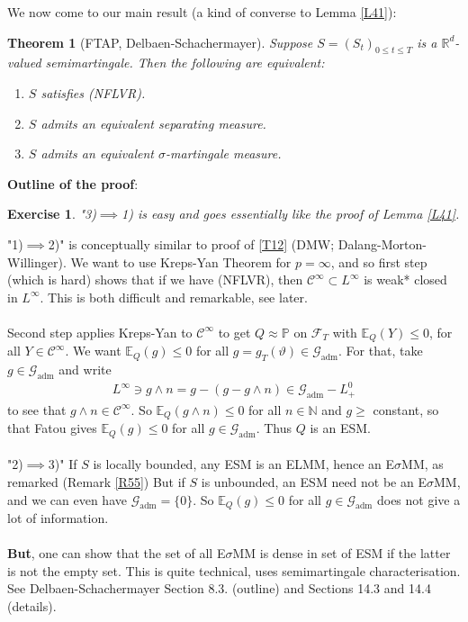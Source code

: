 \documentclass[12pt,a4paper, twoside]{article}
\newtheorem{thm}{Theorem}[section]
\newtheorem{exe}{Exercise}[section]
\theoremstyle{definition}
\newcommand{\EE}{\mathbb{E}} %
\newcommand{\PP}{\mathbb{P}} %
\begin{document}
\newpage
We now come to our main result (a kind of converse to Lemma \ref{L41}):
\begin{thm}[FTAP, Delbaen-Schachermayer] \label{T45} Suppose $S=(S_t)_{0 \leq t \leq T}$ is a $\mathbb{R}^d$-valued semimartingale. Then the following are equivalent:
\begin{enumerate}
\item $S$ satisfies (NFLVR).
\item $S$ admits an equivalent separating measure.
\item $S$ admits an equivalent $\sigma$-martingale measure. 
\end{enumerate}
\end{thm}
\noindent \textbf{Outline of  the proof}:
\begin{exe} \label{ex16} "3)$\implies$1) is easy and goes essentially like the proof of Lemma \ref{L41}.
\end{exe}
\noindent "1)$\implies$2)" is conceptually similar to proof of \ref{T12} (DMW; Dalang-Morton-Willinger). We want to use Kreps-Yan Theorem for $p= \infty$, and so first step (which is hard) shows that if we have (NFLVR), then $\mathcal{C}^\infty \subset L^\infty$ is weak* closed in $L^\infty$. This is both difficult and remarkable,  see later. \\
\\
Second step applies Kreps-Yan to $\mathcal{C}^\infty$ to get $Q \approx \PP$ on $\mathcal{F}_T$ with $\EE_Q(Y) \leq 0$, for all $Y \in \mathcal{C}^\infty$. We want $\EE_Q(g) \leq 0$ for all $g= g_T( \vartheta) \in \mathcal{G}_\text{adm}$. For that, take $g \in \mathcal{G}_\text{adm}$ and write 
\begin{align*}
L^\infty \ni g \wedge n = g-(g-g \wedge n) \in \mathcal{G}_\text{adm}-L_+^0
\end{align*}
to see that $g \wedge n \in \mathcal{C}^\infty$. So $\EE_Q(g \wedge n) \leq 0$ for all $n \in \mathbb{N}$ and $g \geq$ constant, so that Fatou gives $\EE_Q(g) \leq 0$ for all $g \in \mathcal{G}_\text{adm}$. Thus $Q$ is an ESM. 
\\\\
"2)$\implies$3)" If $S$ is locally bounded, any ESM is an ELMM, hence an E$\sigma$MM, as remarked (Remark \ref{R55}) But if $S$ is unbounded, an ESM need not be an E$\sigma$MM, and we can even have $\mathcal{G}_\text{adm}= \{0\}$. So $\EE_Q(g) \leq 0$ for all $g \in \mathcal{G}_\text{adm}$ does not give a lot of information. \\
\\
\textbf{But}, one can show that the set of all E$\sigma$MM is dense in set of ESM if the latter is not the empty set. This is quite technical, uses semimartingale characterisation. See Delbaen-Schachermayer Section 8.3. (outline) and Sections 14.3 and 14.4 (details). 
\end{document}
